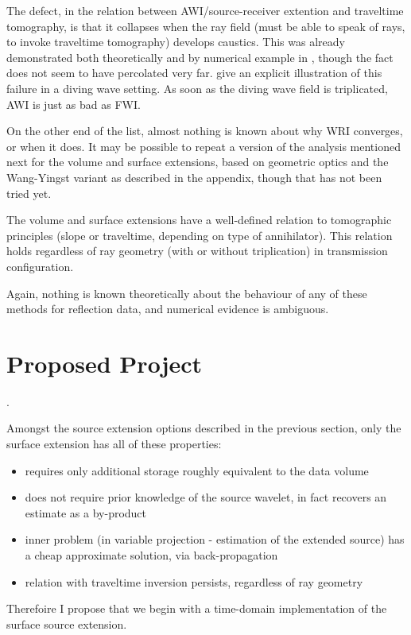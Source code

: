 The defect, in the relation between AWI/source-receiver extention and traveltime tomography, is that it collapses when the ray field (must be able to speak of rays, to invoke traveltime tomography) develops caustics. This was already demonstrated both theoretically and by numerical example in \cite[]{Symes:94c}, though the fact does not seem to have percolated very far. \cite{HuangSymes:17} give an explicit illustration of this failure in a diving wave setting. As soon as the diving wave field is triplicated, AWI is just as bad as FWI.

On the other end of the list, almost nothing is known about why WRI converges, or when it does. It may be possible to repeat a version of the analysis mentioned next for the volume and surface extensions, based on geometric optics and the Wang-Yingst variant as described in the appendix, though that has not been tried yet.

The volume and surface extensions have a well-defined relation to tomographic principles (slope or traveltime, depending on type of annihilator). This relation holds regardless of ray geometry (with or without triplication) in transmission configuration.

Again, nothing is known theoretically about the behaviour of any of these methods for reflection data, and numerical evidence is ambiguous.

\section{Proposed Project}.

Amongst the source extension options described in the previous section, only the surface extension has all of these properties:
\begin{itemize}
\item requires only additional storage roughly equivalent to the data volume
\item does not require prior knowledge of the source wavelet, in fact recovers an estimate as a by-product
\item inner problem (in variable projection - estimation of the extended source) has a cheap approximate solution, via back-propagation
\item relation with traveltime inversion persists, regardless of ray geometry
\end{itemize}

Therefoire I propose that we begin with a time-domain implementation of the surface source extension.

